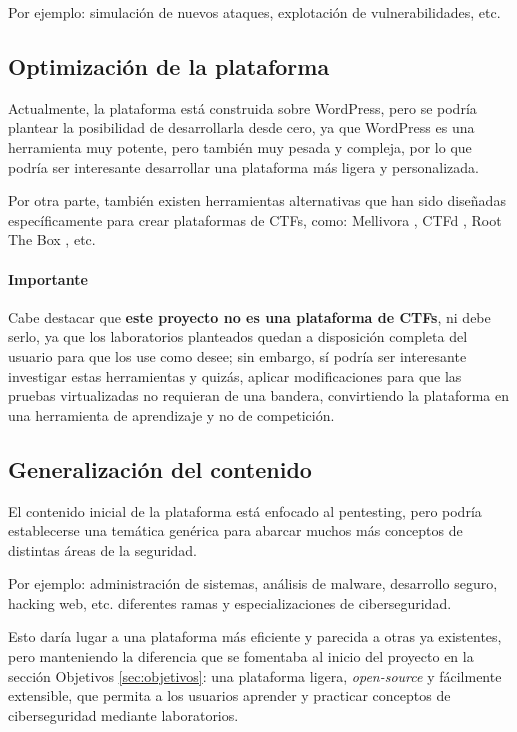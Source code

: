            Por ejemplo: simulación de nuevos ataques, explotación de vulnerabilidades, etc.
        
        \subsection{Optimización de la plataforma}

            Actualmente, la plataforma está construida sobre WordPress, pero se podría plantear la posibilidad de desarrollarla desde cero, ya que WordPress es una herramienta muy potente, pero también muy pesada y compleja, por lo que podría ser interesante desarrollar una plataforma más ligera y personalizada.

            Por otra parte, también existen herramientas alternativas que han sido diseñadas específicamente para crear plataformas de CTFs, como: Mellivora \cite{mellivora}, CTFd \cite{ctfd}, Root The Box \cite{root-the-box}, etc.

            \paragraph{Importante}
            
                Cabe destacar que \textbf{este proyecto no es una plataforma de CTFs}, ni debe serlo, ya que los laboratorios planteados quedan a disposición completa del usuario para que los use como desee; sin embargo, sí podría ser interesante investigar estas herramientas y quizás, aplicar modificaciones para que las pruebas virtualizadas no requieran de una bandera, convirtiendo la plataforma en una herramienta de aprendizaje y no de competición.
            
        \subsection{Generalización del contenido}
            
            El contenido inicial de la plataforma está enfocado al pentesting, pero podría establecerse una temática genérica para abarcar muchos más conceptos de distintas áreas de la seguridad.
            
            Por ejemplo: administración de sistemas, análisis de malware, desarrollo seguro, hacking web, etc. diferentes ramas y especializaciones de ciberseguridad.
            
            Esto daría lugar a una plataforma más eficiente y parecida a otras ya existentes, pero manteniendo la diferencia que se fomentaba al inicio del proyecto en la sección Objetivos \ref{sec:objetivos}: una plataforma ligera, \textit{open-source} y fácilmente extensible, que permita a los usuarios aprender y practicar conceptos de ciberseguridad mediante laboratorios.

